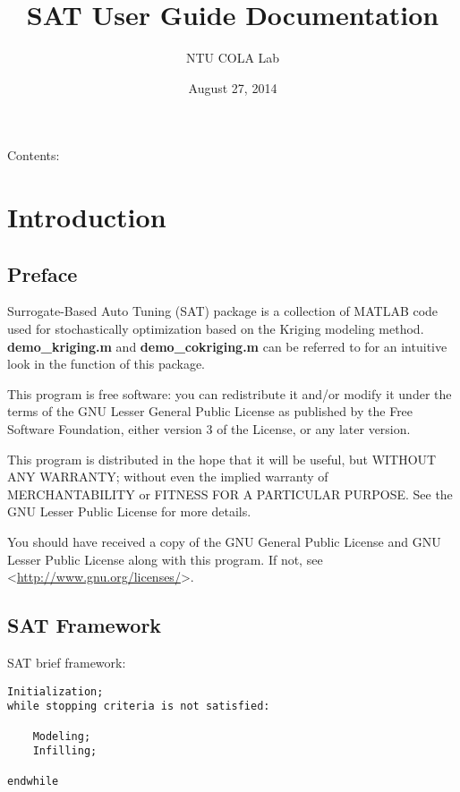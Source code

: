 \documentclass[letterpaper,10pt,english]{sphinxmanual}
\title{SAT User Guide Documentation}
\date{August 27, 2014}
\author{NTU COLA Lab}
\begin{document}
\maketitle
\tableofcontents
{}\label{index::doc}


Contents:


\chapter{Introduction}
\label{intro:introduction}\label{intro::doc}\label{intro:surrogate-based-auto-tuning-sat-user-guide}

\section{Preface}
\label{intro:preface}
Surrogate-Based Auto Tuning (SAT) package is a collection of MATLAB code used for stochastically optimization based on the Kriging modeling method. \textbf{demo\_kriging.m} and \textbf{demo\_cokriging.m}  can be referred to for an intuitive look in the function of this package.

This program is free software: you can redistribute it and/or modify it under the terms of the GNU Lesser General Public License as published by the Free Software Foundation, either version 3 of the License, or any later version.

This program is distributed in the hope that it will be useful, but WITHOUT ANY WARRANTY; without even the implied warranty of MERCHANTABILITY or FITNESS FOR A PARTICULAR PURPOSE. See the GNU Lesser Public License for more details.

You should have received a copy of the GNU General Public License and GNU Lesser Public License along with this program. If not, see \textless{}\href{http://www.gnu.org/licenses/}{http://www.gnu.org/licenses/}\textgreater{}.


\section{SAT Framework}
\label{intro:sat-framework}
SAT brief framework:

\begin{Verbatim}[commandchars=\\\{\}]
Initialization;
while stopping criteria is not satisfied:

    Modeling;
    Infilling;

endwhile
\end{Verbatim}
\end{document}
